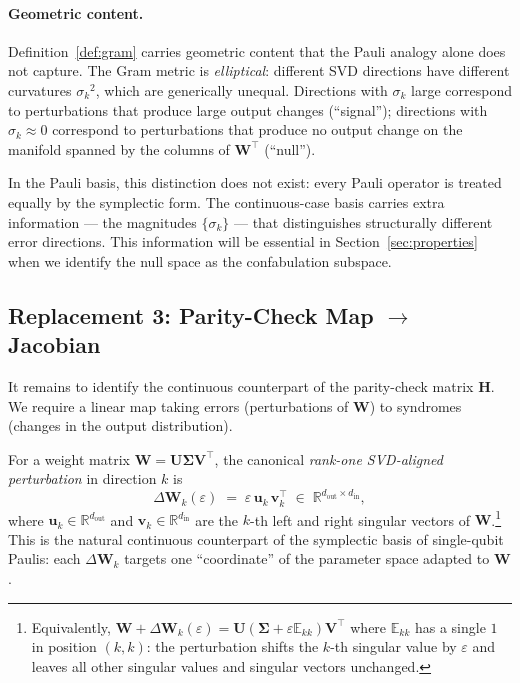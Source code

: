 \documentclass[11pt,a4paper]{article}
\theoremstyle{definition}
\newcommand{\Wm}{\mathbf{W}}
\newcommand{\Um}{\mathbf{U}}
\newcommand{\Vm}{\mathbf{V}}
\newcommand{\Hm}{\mathbf{H}}
\newcommand{\Sig}{\boldsymbol{\Sigma}}
\newcommand{\vk}[1][]{\mathbf{v}_{#1}}
\newcommand{\uk}[1][]{\mathbf{u}_{#1}}
\newcommand{\Rbb}{\mathbb{R}}
\newcommand{\Eop}{\mathbb{E}}
\newcommand{\dimin}{d_{\mathrm{in}}}
\newcommand{\dimout}{d_{\mathrm{out}}}
\begin{document}
\paragraph{Geometric content.}
Definition~\ref{def:gram} carries geometric content that the Pauli analogy alone does not capture. The Gram metric is \emph{elliptical}: different SVD directions have different curvatures $\sigma_k{}^2$, which are generically unequal. Directions with $\sigma_k$ large correspond to perturbations that produce large output changes (``signal''); directions with $\sigma_k\approx 0$ correspond to perturbations that produce no output change on the manifold spanned by the columns of $\Wm^\top$ (``null'').

In the Pauli basis, this distinction does not exist: every Pauli operator is treated equally by the symplectic form. The continuous-case basis carries extra information --- the magnitudes $\{\sigma_k\}$ --- that distinguishes structurally different error directions. This information will be essential in Section~\ref{sec:properties} when we identify the null space as the confabulation subspace.

\subsection{Replacement 3: Parity-Check Map \texorpdfstring{$\to$}{to} Jacobian}
\label{sec:rep3}

It remains to identify the continuous counterpart of the parity-check matrix $\Hm$. We require a linear map taking errors (perturbations of $\Wm$) to syndromes (changes in the output distribution).

For a weight matrix $\Wm = \Um\Sig\Vm^\top$, the canonical \emph{rank-one SVD-aligned perturbation} in direction $k$ is
\begin{equation}
  \Delta\Wm_k(\varepsilon) \;=\; \varepsilon\, \uk[k]\, \vk[k]^\top
  \;\in\; \Rbb^{\dimout \times \dimin},
  \label{eq:err_op}
\end{equation}
where $\uk[k]\in\Rbb^{\dimout}$ and $\vk[k]\in\Rbb^{\dimin}$ are the $k$-th left and right singular vectors of $\Wm$.\footnote{Equivalently, $\Wm + \Delta\Wm_k(\varepsilon) = \Um(\Sig + \varepsilon\Eop_{kk})\Vm^\top$ where $\Eop_{kk}$ has a single $1$ in position $(k,k)$: the perturbation shifts the $k$-th singular value by $\varepsilon$ and leaves all other singular values and singular vectors unchanged.} This is the natural continuous counterpart of the symplectic basis of single-qubit Paulis: each $\Delta\Wm_k$ targets one ``coordinate'' of the parameter space adapted to $\Wm$.
\end{document}
